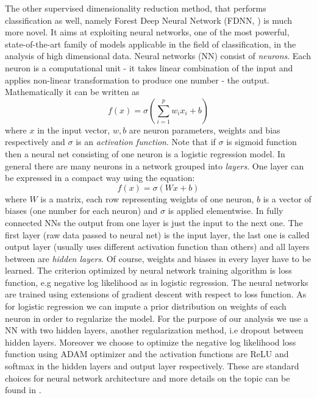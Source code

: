 \documentclass[shortabstract, english, mgr]{iithesis}
\begin{document}
The other supervised dimensionality reduction method, that performs classification as well, namely Forest Deep Neural Network (FDNN, \cite{fDNN}) is much more novel. It aims at exploiting neural networks, one of the most powerful, state-of-the-art family of models applicable in the field of classification, in the analysis of high dimensional data. Neural networks (NN) consist of \textit{neurons}. Each neuron is a computational unit -  it takes linear combination of the input and applies non-linear transformation to produce one number - the output. Mathematically it can be written as $$f(x) = \sigma \left(\sum_{i=1}^p w_ix_i + b\right)$$where $x$ in the input vector, $w,b$ are neuron parameters, weights and bias respectively and $\sigma$ is an \textit{activation function}. Note that if $\sigma$ is sigmoid function then a neural net consisting of one neuron is a logistic regression model. In general there are many neurons in a network grouped into \textit{layers}. One layer can be expressed in a compact way using the equation: $$ f(x) = \sigma \left(Wx + b\right)$$where $W$ is a matrix, each row representing weights of one neuron, $b$ is a vector of biases (one number for each neuron) and $\sigma$ is applied elementwise. In fully connected NNs the output from one layer is just the input to the next one. The first layer (raw data passed to neural net) is the input layer, the last one is called output layer (usually uses different activation function than others) and all layers between are \textit{hidden layers}. Of course, weights and biases in every layer have to be learned. The criterion optimized by neural network training algorithm is loss function, e.g negative log likelihood as in logistic regression. The neural networks are trained using extensions of gradient descent with respect to loss function. As for logistic regression we can impute a prior distribution on weights of each neuron in order to regularize the model. For the purpose of our analysis we use a NN with two hidden layers, another regularization method, i.e dropout between hidden layers. Moreover we choose to optimize the negative log likelihood loss function using ADAM optimizer and the activation functions are ReLU and softmax in the hidden layers and output layer respectively. These are standard choices for neural network architecture and more details on the topic can be found in \cite{deeplearning}.
\end{document}
